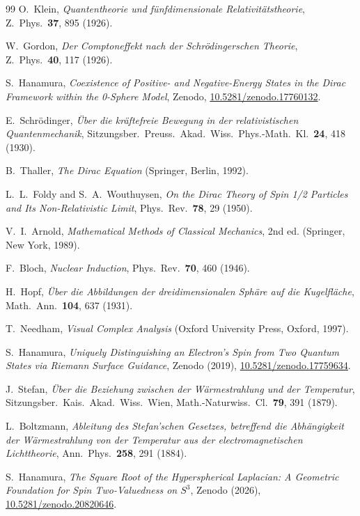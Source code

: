 \documentclass[%
 reprint, amsmath,amssymb, aps, prb, ]{revtex4-2}
\numberwithin{equation}{section}
\begin{document}
\begin{thebibliography}{99}
O.~Klein,
\emph{Quantentheorie und f\"unfdimensionale Relativit\"atstheorie},
Z.~Phys.\ \textbf{37}, 895 (1926).

W.~Gordon,
\emph{Der Comptoneffekt nach der Schr\"odingerschen Theorie},
Z.~Phys.\ \textbf{40}, 117 (1926).

S.~Hanamura,
\emph{Coexistence of Positive- and Negative-Energy States in the Dirac Framework within the 0-Sphere Model},
Zenodo, \href{https://doi.org/10.5281/zenodo.17760132}{10.5281/zenodo.17760132}.

E.~Schr\"odinger,
\emph{\"Uber die kr\"aftefreie Bewegung in der relativistischen Quantenmechanik},
Sitzungsber.~Preuss.~Akad.~Wiss.~Phys.-Math.~Kl.\ \textbf{24}, 418 (1930).

B.~Thaller,
\emph{The Dirac Equation}
(Springer, Berlin, 1992).

L.~L.~Foldy and S.~A.~Wouthuysen,
\emph{On the Dirac Theory of Spin 1/2 Particles and Its Non-Relativistic Limit},
Phys.~Rev.\ \textbf{78}, 29 (1950).

V.~I.~Arnold,
\emph{Mathematical Methods of Classical Mechanics}, 2nd ed.
(Springer, New York, 1989).

F.~Bloch,
\emph{Nuclear Induction},
Phys.~Rev.\ \textbf{70}, 460 (1946).

H.~Hopf,
\emph{\"Uber die Abbildungen der dreidimensionalen Sph\"are auf die Kugelfl\"ache},
Math.~Ann.\ \textbf{104}, 637 (1931).

T.~Needham,
\emph{Visual Complex Analysis}
(Oxford University Press, Oxford, 1997).

S.~Hanamura,
\emph{Uniquely Distinguishing an Electron's Spin from Two Quantum States via Riemann Surface Guidance},
Zenodo (2019), \href{https://doi.org/10.5281/zenodo.17759634}{10.5281/zenodo.17759634}.

J.~Stefan,
\emph{\"Uber die Beziehung zwischen der W\"armestrahlung und der Temperatur},
Sitzungsber.~Kais.~Akad.~Wiss.~Wien, Math.-Naturwiss.~Cl.\ \textbf{79}, 391 (1879).

L.~Boltzmann,
\emph{Ableitung des Stefan'schen Gesetzes, betreffend die Abh\"angigkeit der W\"armestrahlung von der Temperatur aus der electromagnetischen Lichttheorie},
Ann.~Phys.\ \textbf{258}, 291 (1884).

S.~Hanamura,
\emph{The Square Root of the Hyperspherical Laplacian: A Geometric Foundation for Spin Two-Valuedness on $S^3$},
Zenodo (2026), \href{https://doi.org/10.5281/zenodo.20820646}{10.5281/zenodo.20820646}.


\end{thebibliography}
\end{document}
